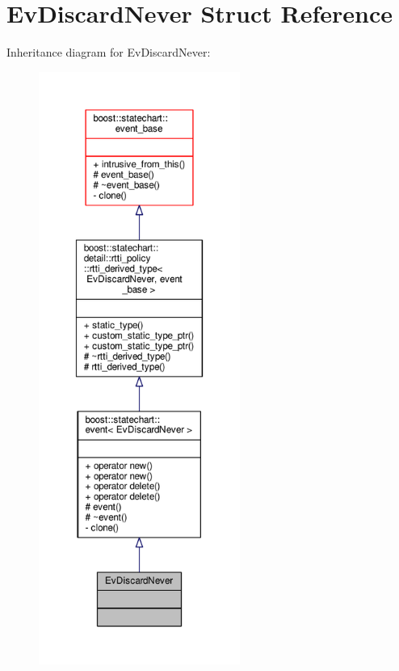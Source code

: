 \hypertarget{struct_ev_discard_never}{}\section{Ev\+Discard\+Never Struct Reference}
\label{struct_ev_discard_never}


Inheritance diagram for Ev\+Discard\+Never\+:
\nopagebreak
\begin{figure}[H]
\begin{center}
\leavevmode
\includegraphics[height=550pt]{struct_ev_discard_never__inherit__graph}
\end{center}
\end{figure}



